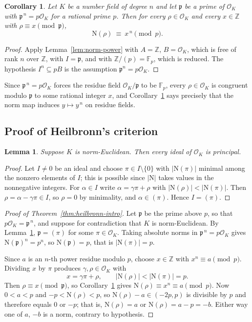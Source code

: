 \documentclass[11pt,reqno]{amsart}
\theoremstyle{plain}
\newtheorem{lemma}[theorem]{Lemma}
\newtheorem{corollary}[theorem]{Corollary}
\theoremstyle{definition}
\theoremstyle{remark}
\newcommand{\Z}{\mathbb{Z}}
\newcommand{\F}{\mathbb{F}}
\newcommand{\OK}{\mathcal{O}_K}
\newcommand{\p}{\mathfrak{p}}
\newcommand{\N}{\mathrm{N}}
\begin{document}
\begin{corollary}\label{cor:norm-power-K}
Let $K$ be a number field of degree $n$ and let $\p$ be a prime of $\OK$ with $\p^{\,n}=p\OK$ for
a rational prime $p$. Then for every $\rho\in\OK$ and every $x\in\Z$ with $\rho\equiv x \pmod \p$,
\[
  \N(\rho)\ \equiv\ x^{\,n}\pmod p .
\]
\end{corollary}

\begin{proof}
Apply Lemma~\ref{lem:norm-power} with $A=\Z$, $B=\OK$, which is free of rank $n$ over $\Z$, with
$I=\p$, and with $\Z/(p)=\F_p$, which is reduced. The hypothesis $I^n\subseteq pB$ is the
assumption $\p^n=p\OK$.
\end{proof}

Since $\p^{\,n}=p\OK$ forces the residue field $\OK/\p$ to be $\F_p$, every $\rho\in\OK$ is
congruent modulo $\p$ to some rational integer $x$, and Corollary~\ref{cor:norm-power-K} says
precisely that the norm map induces $y\mapsto y^{\,n}$ on residue fields.

\subsection{Proof of Heilbronn's criterion}

\begin{lemma}\label{lem:principal}
Suppose $K$ is norm-Euclidean. Then every ideal of $\OK$ is principal.
\end{lemma}

\begin{proof}
Let $I\ne 0$ be an ideal and choose $\pi\in I\setminus\{0\}$ with $|\N(\pi)|$ minimal among the
nonzero elements of $I$; this is possible since $|\N|$ takes values in the nonnegative integers.
For $\alpha\in I$ write $\alpha=\gamma\pi+\rho$ with $|\N(\rho)|<|\N(\pi)|$. Then
$\rho=\alpha-\gamma\pi\in I$, so $\rho=0$ by minimality, and $\alpha\in(\pi)$. Hence $I=(\pi)$.
\end{proof}

\begin{proof}[Proof of Theorem~\ref{thm:heilbronn-intro}]
Let $\p$ be the prime above $p$, so that $p\OK=\p^{\,n}$, and suppose for contradiction that $K$
is norm-Euclidean. By Lemma~\ref{lem:principal}, $\p=(\pi)$ for some $\pi\in\OK$. Taking absolute
norms in $\p^{\,n}=p\OK$ gives $\N(\p)^n=p^n$, so $\N(\p)=p$, that is $|\N(\pi)|=p$.

Since $a$ is an $n$-th power residue modulo $p$, choose $x\in\Z$ with $x^n\equiv a \pmod p$.
Dividing $x$ by $\pi$ produces $\gamma,\rho\in\OK$ with
\[
  x=\gamma\pi+\rho,\qquad |\N(\rho)|<|\N(\pi)|=p .
\]
Then $\rho\equiv x \pmod{\p}$, so Corollary~\ref{cor:norm-power-K} gives
$\N(\rho)\equiv x^n\equiv a \pmod p$. Now $0<a<p$ and $-p<\N(\rho)<p$, so
$\N(\rho)-a\in(-2p,p)$ is divisible by $p$ and therefore equals $0$ or $-p$; that is,
$\N(\rho)=a$ or $\N(\rho)=a-p=-b$. Either way one of $a$, $-b$ is a norm, contrary to hypothesis.
\end{proof}
\end{document}
